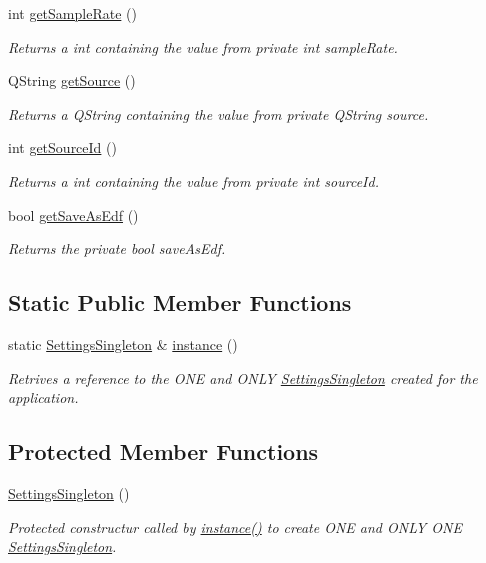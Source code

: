 \begin{DoxyCompactItemize}
int \hyperlink{classSettingsSingleton_a11896cc46cb374ae6a8234e1cd3cb68f}{get\+Sample\+Rate} ()
\begin{DoxyCompactList}\small\item\em Returns a int containing the value from private int sample\+Rate. \end{DoxyCompactList}\item 
Q\+String \hyperlink{classSettingsSingleton_a612c925c64e9862b0fdeca1b5f8f4773}{get\+Source} ()
\begin{DoxyCompactList}\small\item\em Returns a Q\+String containing the value from private Q\+String source. \end{DoxyCompactList}\item 
int \hyperlink{classSettingsSingleton_aa6db88481c421b96974519b8e28192c9}{get\+Source\+Id} ()
\begin{DoxyCompactList}\small\item\em Returns a int containing the value from private int source\+Id. \end{DoxyCompactList}\item 
bool \hyperlink{classSettingsSingleton_ad40343fdaed55e07e0b98361792ab142}{get\+Save\+As\+Edf} ()
\begin{DoxyCompactList}\small\item\em Returns the private bool save\+As\+Edf. \end{DoxyCompactList}\end{DoxyCompactItemize}
\subsection*{Static Public Member Functions}
\begin{DoxyCompactItemize}
\item 
static \hyperlink{classSettingsSingleton}{Settings\+Singleton} \& \hyperlink{classSettingsSingleton_aad528becd7ce5903c418a5b8b718074c}{instance} ()
\begin{DoxyCompactList}\small\item\em Retrives a reference to the O\+NE and O\+N\+LY \hyperlink{classSettingsSingleton}{Settings\+Singleton} created for the application. \end{DoxyCompactList}\end{DoxyCompactItemize}
\subsection*{Protected Member Functions}
\begin{DoxyCompactItemize}
\item 
\hyperlink{classSettingsSingleton_af3d8ea55c2c625c0b6504b472d8664af}{Settings\+Singleton} ()
\begin{DoxyCompactList}\small\item\em Protected constructur called by \hyperlink{classSettingsSingleton_aad528becd7ce5903c418a5b8b718074c}{instance()} to create O\+NE and O\+N\+LY O\+NE \hyperlink{classSettingsSingleton}{Settings\+Singleton}. \end{DoxyCompactList}\end{DoxyCompactItemize}


